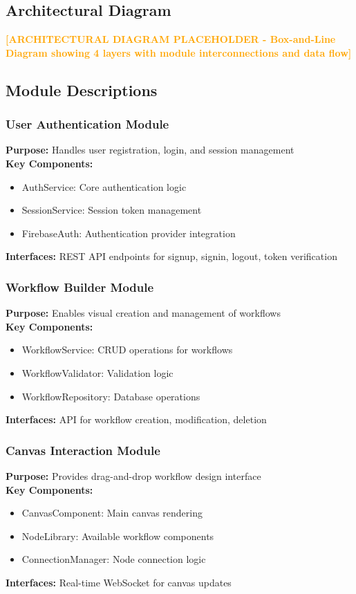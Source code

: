 \documentclass[12pt,a4paper]{article}
\begin{document}
\subsection{Architectural Diagram}

\textcolor{orange}{\textbf{[ARCHITECTURAL DIAGRAM PLACEHOLDER - Box-and-Line Diagram showing 4 layers with module interconnections and data flow]}}

\newpage

\subsection{Module Descriptions}

\subsubsection{User Authentication Module}
\textbf{Purpose:} Handles user registration, login, and session management\\
\textbf{Key Components:}
\begin{itemize}
    \item AuthService: Core authentication logic
    \item SessionService: Session token management
    \item FirebaseAuth: Authentication provider integration
\end{itemize}
\textbf{Interfaces:} REST API endpoints for signup, signin, logout, token verification

\subsubsection{Workflow Builder Module}
\textbf{Purpose:} Enables visual creation and management of workflows\\
\textbf{Key Components:}
\begin{itemize}
    \item WorkflowService: CRUD operations for workflows
    \item WorkflowValidator: Validation logic
    \item WorkflowRepository: Database operations
\end{itemize}
\textbf{Interfaces:} API for workflow creation, modification, deletion

\subsubsection{Canvas Interaction Module}
\textbf{Purpose:} Provides drag-and-drop workflow design interface\\
\textbf{Key Components:}
\begin{itemize}
    \item CanvasComponent: Main canvas rendering
    \item NodeLibrary: Available workflow components
    \item ConnectionManager: Node connection logic
\end{itemize}
\textbf{Interfaces:} Real-time WebSocket for canvas updates
\end{document}
